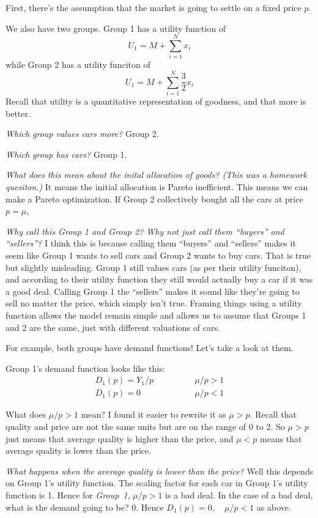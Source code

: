 \documentclass[11pt]{article}
\begin{document}
First, there's the assumption that the market is going to settle on a fixed price $p$. 


We also have two groups. Group 1 has a utility function of 
$$U_1 = M + \sum_{i=1}^N x_i$$
while Group 2 has a utility funciton of 
$$U_1 = M + \sum_{i=1}^N \frac{3}{2}x_i$$
Recall that utility is a quantitative representation of goodness, and that more is better. 

{\it Which group values cars more?} Group 2.

{\it Which group has cars?} Group 1.

{\it What does this mean about the inital allocation of goods? (This was a homework quesiton.)} It means the initial allocation is Pareto inefficient. This means we can make a Pareto optimization. If Group 2 collectively bought all the cars at price $p = \mu$, 

{\it Why call this Group 1 and Group 2? Why not just call them ``buyers'' and ``sellers''?} I think this is because calling them ``buyers'' and ``sellers'' makes it seem like Group 1 wants to sell cars and Group 2 wants to buy cars. That is true but slightly misleading. Group 1 still values cars (as per their utility funciton), and according to their utility function they still would actually buy a car if it was a good deal. Calling Group 1 the ``sellers'' makes it sound like they're going to sell no matter the price, which simply isn't true. Framing things using a utility function allows the model remain simple and allows us to assume that Groups 1 and 2 are the same, just with different valuations of cars.

For example, both groups have demand functions! Let's take a look at them.

Group 1's demand function looks like this:
\begin{align*}
D_1(p) = Y_1/p & \qquad \qquad \mu/p > 1 \\
D_1(p) = 0 & \qquad \qquad \mu/p < 1
\end{align*}

What does $\mu/p > 1$ mean? I found it easier to rewrite it as $\mu > p$. Recall that quality and price are not the same units but are on the range of 0 to 2. So $\mu > p$ just means that average quality is higher than the price, and $\mu < p$ means that average quality is lower than the price. 

{\it What happens when the average quality is lower than the price?} Well this depends on Group 1's utility function. The scaling factor for each car in Group 1's utility function is 1. Hence for {\it Group~1}, $\mu/p > 1$ is a bad deal. In the case of a bad deal, what is the demand going to be? 0. Hence $D_1(p) = 0, \quad \mu/p < 1$ as above.
\end{document}
